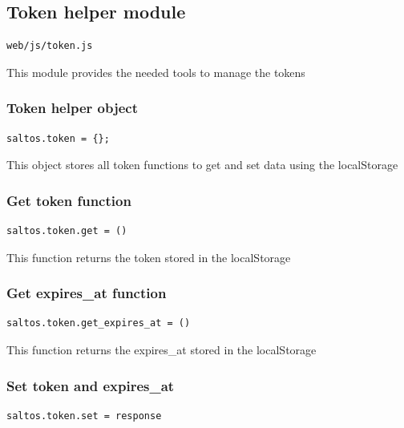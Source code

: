 \documentclass[a4paper]{article}
\begin{document}
\hypertarget{toc299}{}
\subsection{Token helper module}

\begin{lstlisting}
web/js/token.js
\end{lstlisting}

This module provides the needed tools to manage the tokens

\hypertarget{toc300}{}
\subsubsection{Token helper object}

\begin{lstlisting}
saltos.token = {};
\end{lstlisting}

This object stores all token functions to get and set data using the localStorage

\hypertarget{toc301}{}
\subsubsection{Get token function}

\begin{lstlisting}
saltos.token.get = ()
\end{lstlisting}

This function returns the token stored in the localStorage

\hypertarget{toc302}{}
\subsubsection{Get expires\_at function}

\begin{lstlisting}
saltos.token.get_expires_at = ()
\end{lstlisting}

This function returns the expires\_at stored in the localStorage

\hypertarget{toc303}{}
\subsubsection{Set token and expires\_at}

\begin{lstlisting}
saltos.token.set = response
\end{lstlisting}
\end{document}
